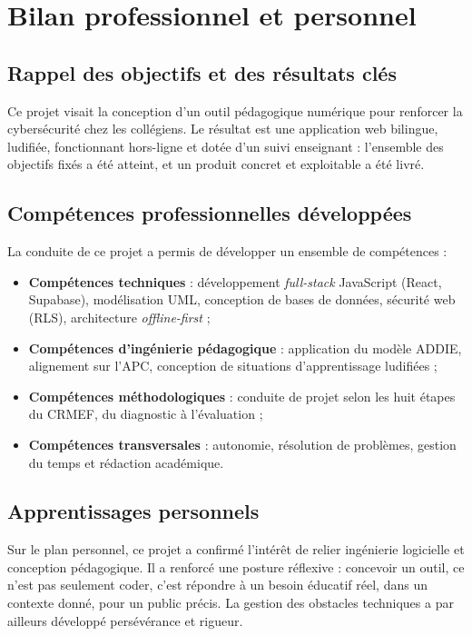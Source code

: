 \documentclass[12pt, a4paper, oneside]{report}
\begin{document}
\chapter*{Bilan professionnel et personnel}

\section*{Rappel des objectifs et des résultats clés}
Ce projet visait la conception d'un outil pédagogique numérique pour renforcer la cybersécurité chez les collégiens. Le résultat est une application web bilingue, ludifiée, fonctionnant hors-ligne et dotée d'un suivi enseignant : l'ensemble des objectifs fixés a été atteint, et un produit concret et exploitable a été livré.

\section*{Compétences professionnelles développées}
La conduite de ce projet a permis de développer un ensemble de compétences :
\begin{itemize}[leftmargin=*]
  \item \textbf{Compétences techniques} : développement \textit{full-stack} JavaScript (React, Supabase), modélisation UML, conception de bases de données, sécurité web (RLS), architecture \textit{offline-first} ;
  \item \textbf{Compétences d'ingénierie pédagogique} : application du modèle ADDIE, alignement sur l'APC, conception de situations d'apprentissage ludifiées ;
  \item \textbf{Compétences méthodologiques} : conduite de projet selon les huit étapes du CRMEF, du diagnostic à l'évaluation ;
  \item \textbf{Compétences transversales} : autonomie, résolution de problèmes, gestion du temps et rédaction académique.
\end{itemize}

\section*{Apprentissages personnels}
Sur le plan personnel, ce projet a confirmé l'intérêt de relier ingénierie logicielle et conception pédagogique. Il a renforcé une posture réflexive : concevoir un outil, ce n'est pas seulement coder, c'est répondre à un besoin éducatif réel, dans un contexte donné, pour un public précis. La gestion des obstacles techniques a par ailleurs développé persévérance et rigueur.
\end{document}
